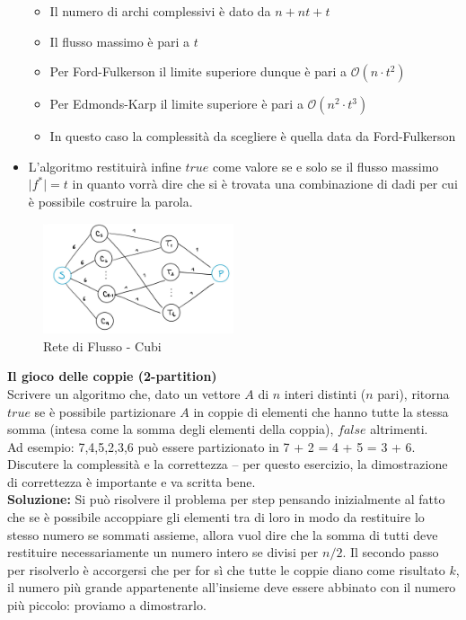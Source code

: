 \documentclass[../cheatSheetAlgoritmi.tex]{subfiles}
\begin{document}
\begin{itemize}
\begin{itemize}
			\item Il numero di archi complessivi è dato da $n + nt + t$
			\item Il flusso massimo è pari a $t$
			\item Per Ford-Fulkerson il limite superiore dunque è pari a $\mathcal{O}(n \cdot t^{2})$
			\item Per Edmonds-Karp il limite superiore è pari a $\mathcal{O}(n^{2} \cdot t^{3})$
			\item In questo caso la complessità da scegliere è quella data da Ford-Fulkerson
		\end{itemize}
		\item L'algoritmo restituirà infine $true$ come valore se e solo se il flusso massimo $\mid f^{*} \mid = t$ in quanto vorrà dire che si è trovata una combinazione di dadi per cui è possibile costruire la parola.
\end{itemize}
\begin{figure}[H]
\caption{Rete di Flusso - Cubi}
\centering
\includegraphics[width=0.5\textwidth]{../img/Locale_2.jpg}
\end{figure}
\textbf{Il gioco delle coppie (2-partition)}\\
Scrivere un algoritmo che, dato un vettore $A$ di $n$ interi distinti ($n$ pari), ritorna $true$ se è possibile partizionare $A$ in coppie di elementi che hanno tutte la stessa somma (intesa come la somma degli elementi della coppia), $false$ altrimenti.\\
Ad esempio: 7,4,5,2,3,6 può essere partizionato in 7 + 2 = 4 + 5 = 3 + 6.\\
Discutere la complessità e la correttezza – per questo esercizio, la dimostrazione di correttezza è importante e va scritta bene.\\
\textbf{Soluzione:} Si può risolvere il problema per step pensando inizialmente al fatto che se è possibile accoppiare gli elementi tra di loro in modo da restituire lo stesso numero se sommati assieme, allora vuol dire che la somma di tutti deve restituire necessariamente un numero intero se divisi per $n / 2$. Il secondo passo per risolverlo è accorgersi che per for sì che tutte le coppie diano come risultato $k$, il numero più grande appartenente all'insieme deve essere abbinato con il numero più piccolo: proviamo a dimostrarlo.
\end{document}
